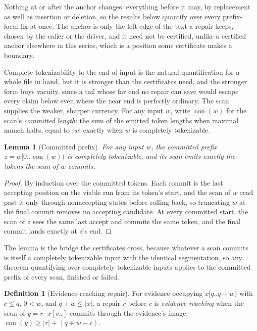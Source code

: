 \documentclass[11pt,a4paper]{article}
\theoremstyle{definition}
\newtheorem{definition}{Definition}
\theoremstyle{plain}
\newtheorem{lemma}{Lemma}
\theoremstyle{remark}
\newcommand{\suffix}[2]{#1[#2..]}
\newcommand{\prefix}[2]{#1[0..#2)}
\newcommand{\window}[3]{#1[#2..#3)}
\newcommand{\con}{\operatorname{con}}
\begin{document}
Nothing at or after the anchor changes; everything before it may, by replacement as well as insertion or deletion, so
the results below quantify over every prefix-local fix at once. The anchor is only the left edge of the text a repair
keeps, chosen by the caller or the driver, and it need not be certified, unlike a certified anchor elsewhere in this
series, which is a position some certificate makes a boundary.

Complete tokenizability to the end of input is the natural quantification for a whole file in hand, but it is stronger
than the certificates need, and the stronger form buys vacuity, since a tail whose far end no repair can save would
escape every claim below even where the near end is perfectly ordinary. The scan supplies the weaker, sharper currency.
For any input $w$, write $\con(w)$ for the scan's \emph{committed length}: the sum of the emitted token lengths when
maximal munch halts, equal to $|w|$ exactly when $w$ is completely tokenizable.

\begin{lemma}[Committed prefix]
\label{lem:committed}
For any input $w$, the committed prefix $z = \prefix{w}{\con(w)}$ is completely tokenizable, and its scan emits exactly
the tokens the scan of $w$ commits.
\end{lemma}

\begin{proof}
By induction over the committed tokens. Each commit is the last accepting position on the viable run from its token's
start, and the scan of $w$ read past it only through nonaccepting states before rolling back, so truncating $w$ at the
final commit removes no accepting candidate. At every committed start, the scan of $z$ sees the same last accept and
commits the same token, and the final commit lands exactly at $z$'s end.
\end{proof}

The lemma is the bridge the certificates cross, because whatever a scan commits is itself a completely tokenizable input
with the identical segmentation, so any theorem quantifying over completely tokenizable inputs applies to the committed
prefix of every scan, finished or failed.

\begin{definition}[Evidence-reaching repair]
\label{def:reaching}
For evidence occupying $\window{x}{q}{q+w}$ with $c \le q$, $0 < w$, and $q + w \le |x|$, a repair $r$ before $c$ is
\emph{evidence-reaching} when the scan of $y = r \cdot \suffix{x}{c}$ commits through the evidence's image:
$\con(y) \ge |r| + (q + w - c)$.
\end{definition}
\end{document}
